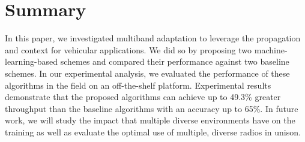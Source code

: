 \section{Summary}
\label{sec:vncsummary}


In this paper, we investigated multiband adaptation to leverage the propagation and context for vehicular applications. 
We did so by proposing two machine-learning-based schemes and compared their
performance against two baseline schemes.
In our experimental analysis, we evaluated the performance of these algorithms 
in the field on an off-the-shelf platform.
Experimental results demonstrate that the proposed algorithms can 
achieve up to 49.3\% greater throughput than the baseline algorithms
with an accuracy up to 65\%. In future work, we will study the impact that
multiple diverse environments have on the training as well as evaluate
the optimal use of multiple, diverse radios in unison.
